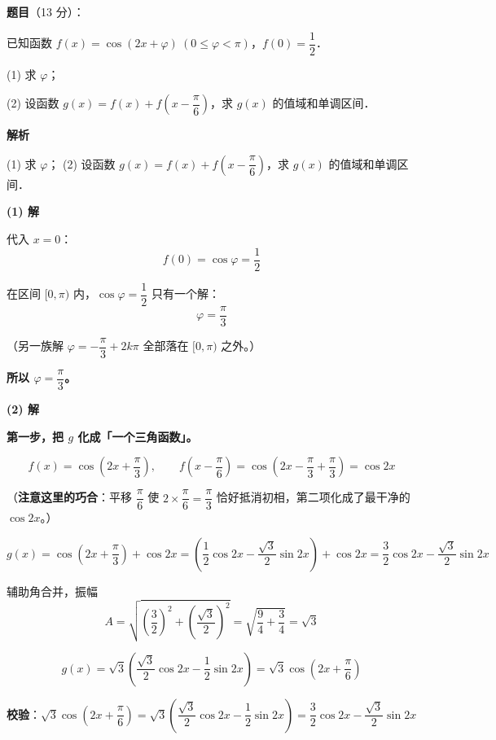 \begin{answer}

\textbf{题目}（13 分）：

已知函数 $f(x)=\cos(2x+\varphi)\ (0\le\varphi<\pi)$，$f(0)=\dfrac12$．

  (1) 求 $\varphi$；

  (2) 设函数 $g(x)=f(x)+f\left(x-\dfrac{\pi}{6}\right)$，求 $g(x)$ 的值域和单调区间．

\textbf{解析}

  (1) 求 $\varphi$；
  (2) 设函数 $g(x)=f(x)+f\left(x-\dfrac{\pi}{6}\right)$，求 $g(x)$ 的值域和单调区间．

\par\medskip

\textbf{(1) 解}

代入 $x=0$：
\nopagebreak[4]
\[f(0)=\cos\varphi=\frac12\]

在区间 $[0,\pi)$ 内，$\cos\varphi=\dfrac12$ 只有一个解：
\nopagebreak[4]
\[\varphi=\frac\pi3\]

（另一族解 $\varphi=-\dfrac\pi3+2k\pi$ 全部落在 $[0,\pi)$ 之外。）

\textbf{所以 $\varphi=\dfrac\pi3$。}

\par\medskip

\textbf{(2) 解}

\textbf{第一步，把 $g$ 化成「一个三角函数」。}

\nopagebreak[4]
\[f(x)=\cos\left(2x+\frac\pi3\right),\qquad f\left(x-\frac\pi6\right)=\cos\left(2x-\frac\pi3+\frac\pi3\right)=\cos 2x\]

（\textbf{注意这里的巧合}：平移 $\dfrac\pi6$ 使 $2\times\dfrac\pi6=\dfrac\pi3$ 恰好抵消初相，第二项化成了最干净的 $\cos2x$。）

\nopagebreak[4]
\[g(x)=\cos\left(2x+\frac\pi3\right)+\cos2x=\left(\frac12\cos2x-\frac{\sqrt3}{2}\sin2x\right)+\cos2x=\frac32\cos2x-\frac{\sqrt3}{2}\sin2x\]

辅助角合并，振幅
\nopagebreak[4]
\[A=\sqrt{\left(\frac32\right)^2+\left(\frac{\sqrt3}{2}\right)^2}=\sqrt{\frac94+\frac34}=\sqrt3\]

\nopagebreak[4]
\[g(x)=\sqrt3\left(\frac{\sqrt3}{2}\cos2x-\frac12\sin2x\right)=\sqrt3\cos\left(2x+\frac\pi6\right)\]

\textbf{校验}：$\sqrt3\cos\left(2x+\dfrac\pi6\right)=\sqrt3\left(\dfrac{\sqrt3}{2}\cos2x-\dfrac12\sin2x\right)=\dfrac32\cos2x-\dfrac{\sqrt3}{2}\sin2x$ 


\end{answer}
